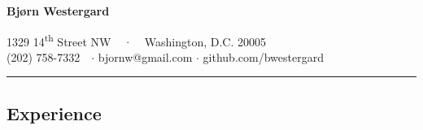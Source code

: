 \documentclass[10pt,letterpaper]{article}
\begin{document}
\begin{center}
{\Huge \textbf{Bjørn Westergard}}
\vspace{.8em}

1329 14\textsuperscript{th} Street NW \ \ {$\cdot$}
\ \ Washington, D.C. 20005
\\
(202) 758-7332\ \ {$\cdot$}
bjornw@gmail.com {$\cdot$}
github.com/bwestergard
\end{center}

\begin{center}
\hrule
\vspace{-0.4em}
\subsection*{Experience}
\end{center}
\end{document}
